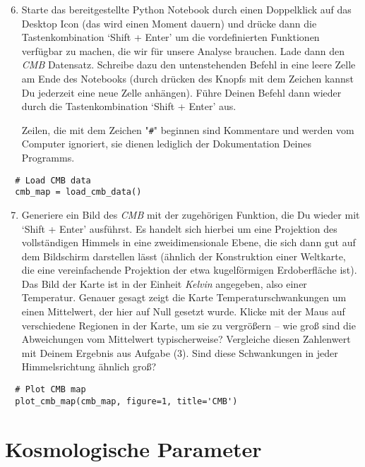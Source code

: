\documentclass[12pt,twoside,a4paper]{article}
\newcommand{\cmb}{\emph{CMB}\xspace}
\newcommand{\plus}{\raisebox{-0.3ex}{\faPlusSquareO}\xspace}
\begin{document}
\begin{enumerate}
  \setcounter{enumi}{5}
\item Starte das bereitgestellte Python Notebook durch einen
  Doppelklick auf das Desktop Icon (das wird einen Moment dauern) und
  dr\"ucke dann die Tastenkombination `Shift + Enter' um die
  vordefinierten Funktionen verf\"ugbar zu machen, die wir f\"ur
  unsere Analyse brauchen. Lade dann den \cmb Datensatz. Schreibe dazu
  den untenstehenden Befehl in eine leere Zelle am Ende des Notebooks
  (durch dr\"ucken des Knopfs mit dem Zeichen \plus kannst Du
  jederzeit eine neue Zelle anh\"angen). F\"uhre Deinen Befehl dann
  wieder durch die Tastenkombination `Shift + Enter' aus.

  Zeilen, die mit dem Zeichen "\texttt{\#}" beginnen sind Kommentare
  und werden vom Computer ignoriert, sie dienen lediglich der
  Dokumentation Deines Programms.
\end{enumerate}
\vspace{-1ex}
\begin{lstlisting}
  # Load CMB data
  cmb_map = load_cmb_data()
\end{lstlisting}
\begin{enumerate}
  \setcounter{enumi}{6}
\item Generiere ein Bild des \cmb mit der zugeh\"origen Funktion, die
  Du wieder mit `Shift + Enter' ausf\"uhrst. Es handelt sich hierbei
  um eine Projektion des vollst\"andigen Himmels in eine
  zweidimensionale Ebene, die sich dann gut auf dem Bildschirm
  darstellen l\"asst (\"ahnlich der Konstruktion einer Weltkarte, die
  eine vereinfachende Projektion der etwa kugelf\"ormigen
  Erdoberfl\"ache ist). Das Bild der Karte ist in der Einheit
  \emph{Kelvin} angegeben, also einer Temperatur. Genauer gesagt zeigt
  die Karte Temperaturschwankungen um einen Mittelwert, der hier auf
  Null gesetzt wurde. Klicke mit der Maus auf verschiedene Regionen in
  der Karte, um sie zu vergr\"o{\ss}ern -- wie gro{\ss} sind die
  Abweichungen vom Mittelwert typischerweise? Vergleiche diesen
  Zahlenwert mit Deinem Ergebnis aus Aufgabe (3). Sind diese
  Schwankungen in jeder Himmelsrichtung \"ahnlich gro{\ss}?
\end{enumerate}
\vspace{-1ex}
\begin{lstlisting}
  # Plot CMB map
  plot_cmb_map(cmb_map, figure=1, title='CMB')
\end{lstlisting}




\section{Kosmologische Parameter}
\end{document}

